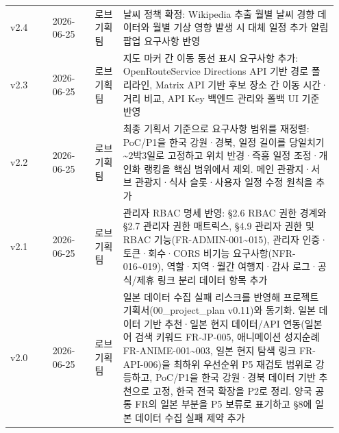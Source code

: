 \documentclass[12pt,a4paper]{article}
\newcommand{\DocNeedspace}[1]{\par\ifdim\dimexpr\pagegoal-\pagetotal\relax<#1\newpage\fi}
\renewcommand{\arraystretch}{1.35}
\begin{document}
\DocNeedspace{8\baselineskip}
\begin{footnotesize}
\setlength{\tabcolsep}{3pt}
\setlength{\extrarowheight}{1pt}
\renewcommand{\arraystretch}{1.48}
\begin{longtable}{@{}>{\centering\arraybackslash}m{0.125\linewidth}>{\centering\arraybackslash}m{0.125\linewidth}>{\centering\arraybackslash}m{0.083\linewidth}>{\RaggedRight\arraybackslash}m{0.614\linewidth}@{}}
\toprule
\multicolumn{1}{>{\centering\arraybackslash}m{0.125\linewidth}}{\textbf{버전}} & \multicolumn{1}{>{\centering\arraybackslash}m{0.125\linewidth}}{\textbf{날짜}} & \multicolumn{1}{>{\centering\arraybackslash}m{0.083\linewidth}}{\textbf{작성자}} & \multicolumn{1}{>{\centering\arraybackslash}m{0.614\linewidth}}{\textbf{변경 내용}} \\
\midrule
\endhead
v2.4 & {\footnotesize 2026-\allowbreak{}06-\allowbreak{}25} & 로브 기획팀 & 날씨 정책 확정: Wikipedia 추출 월별 날씨 경향 데이터와 월별 기상 영향 발생 시 대체 일정 추가 알림 팝업 요구사항 반영 \\
v2.3 & {\footnotesize 2026-\allowbreak{}06-\allowbreak{}25} & 로브 기획팀 & 지도 마커 간 이동 동선 표시 요구사항 추가: OpenRouteService Directions API 기반 경로 폴리라인, Matrix API 기반 후보 장소 간 이동 시간·거리 비교, API Key 백엔드 관리와 폴백 UI 기준 반영 \\
v2.2 & {\footnotesize 2026-\allowbreak{}06-\allowbreak{}25} & 로브 기획팀 & 최종 기획서 기준으로 요구사항 범위를 재정렬: PoC/P1을 한국 강원·경북, 일정 길이를 당일치기\textasciitilde{}2박3일로 고정하고 위치 반경·즉흥 일정 조정·개인화 랭킹을 핵심 범위에서 제외. 메인 관광지·서브 관광지·식사 슬롯·사용자 일정 수정 원칙을 추가 \\
v2.1 & {\footnotesize 2026-\allowbreak{}06-\allowbreak{}25} & 로브 기획팀 & 관리자 RBAC 명세 반영: §2.6 RBAC 권한 경계와 §2.7 관리자 권한 매트릭스, §4.9 관리자 권한 및 RBAC 기능(FR-ADMIN-001\textasciitilde{}015), 관리자 인증·토큰·회수·CORS 비기능 요구사항(NFR-016\textasciitilde{}019), 역할·지역·월간 여행지·감사 로그·공식/제휴 링크 분리 데이터 항목 추가 \\
v2.0 & {\footnotesize 2026-\allowbreak{}06-\allowbreak{}25} & 로브 기획팀 & 일본 데이터 수집 실패 리스크를 반영해 프로젝트 기획서(00\_project\_plan v0.11)와 동기화. 일본 데이터 기반 추천·일본 현지 데이터/API 연동(일본어 검색 키워드 FR-JP-005, 애니메이션 성지순례 FR-ANIME-001\textasciitilde{}003, 일본 현지 탐색 링크 FR-API-006)을 최하위 우선순위 P5 재검토 범위로 강등하고, PoC/P1을 한국 강원·경북 데이터 기반 추천으로 고정, 한국 전국 확장을 P2로 정리. 양국 공통 FR의 일본 부분을 P5 보류로 표기하고 §8에 일본 데이터 수집 실패 제약 추가 \\

\end{longtable}
\end{footnotesize}
\end{document}
